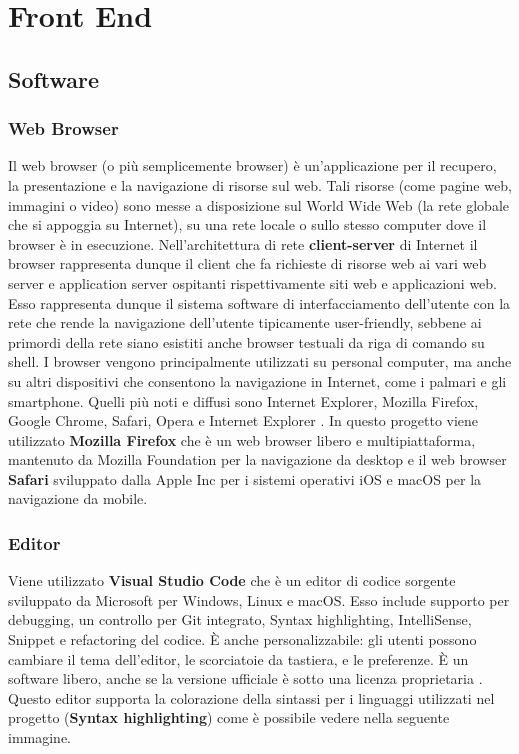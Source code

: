 \section{Front End}
\subsection{Software}
\subsubsection{Web Browser}
Il web browser (o più semplicemente browser) è un'applicazione per il recupero, la presentazione e la navigazione di risorse sul web. Tali risorse (come pagine web, immagini o video) sono messe a disposizione sul World Wide Web (la rete globale che si appoggia su Internet), su una rete locale o sullo stesso computer dove il browser è in esecuzione. 
Nell'architettura di rete \textbf{client-server} di Internet il browser rappresenta dunque il client che fa richieste di risorse web ai vari web server e application server ospitanti rispettivamente siti web e applicazioni web. Esso rappresenta dunque il sistema software di interfacciamento dell'utente con la rete che rende la navigazione dell'utente tipicamente user-friendly, sebbene ai primordi della rete siano esistiti anche browser testuali da riga di comando su shell. I browser vengono principalmente utilizzati su personal computer, ma anche su altri dispositivi che consentono la navigazione in Internet, come i palmari e gli smartphone. Quelli più noti e diffusi sono Internet Explorer, Mozilla Firefox, Google Chrome, Safari, Opera e Internet Explorer \cite{sito_web_browser}.
\newline \newline
In questo progetto viene utilizzato \textbf{Mozilla Firefox} che è un web browser libero e multipiattaforma, mantenuto da Mozilla Foundation per la navigazione da desktop e il web browser \textbf{Safari} sviluppato dalla Apple Inc per i sistemi operativi iOS e macOS per la navigazione da mobile.

\subsubsection{Editor}
Viene utilizzato \textbf{Visual Studio Code} che è un editor di codice sorgente sviluppato da Microsoft per Windows, Linux e macOS. Esso include supporto per debugging, un controllo per Git integrato, Syntax highlighting, IntelliSense, Snippet e refactoring del codice. È anche personalizzabile: gli utenti possono cambiare il tema dell'editor, le scorciatoie da tastiera, e le preferenze. È un software libero, anche se la versione ufficiale è sotto una licenza proprietaria \cite{sito_visual_studio_code}.
\newline
Questo editor supporta la colorazione della sintassi per i linguaggi utilizzati nel progetto (\textbf{Syntax highlighting}) come è possibile vedere nella seguente immagine.

